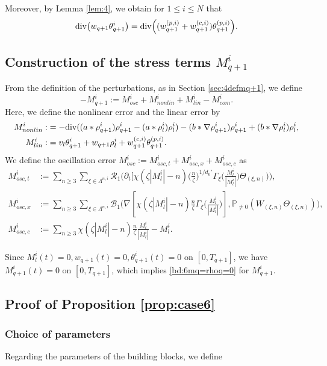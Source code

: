 \documentclass[UTF-8,reqno]{amsart}
\numberwithin{equation}{section}
\theoremstyle{definition}
\def\({{\Big(}}
\def\){{\Big)}}
\def\geq{\geqslant}
\def\leq{\leqslant}
\def\div{\mathord{{\rm div}}}
\def\({{\Big(}}
\def\){{\Big)}}
\def\geq{\geqslant}
\def\leq{\leqslant}
\def\div{\mathord{{\rm div}}}
\begin{document}
Moreover, by Lemma \ref{lem:4}, we obtain for
$
1\leq i\leq N 
$
that
\begin{align}
\div\bigl(
w_{q+1}\theta_{q+1}^i
\bigr)
=
\div\(
(w_{q+1}^{(p,i)}+w_{q+1}^{(c,i)})
\theta_{q+1}^{(p,i)}
\).\notag
\end{align}


\subsection{Construction of the stress terms $M^{i}_{q+1}$}\label{sec:6defmq+1}

From  the definition of the perturbations, as in Section \ref{sec:4defmq+1},  
we   define 
 $$-{M}^i_{q+1}:=M^{i}_{osc}+M^{i}_{nonlin}+M^{i}_{lin}-M_{com}^i.$$
 Here, we define the nonlinear error and the linear error   by
\begin{align*} 
M^{i}_{nonlin}:&= -\div( (a*\rho^{i}_{q+1}) \rho^{i}_{q+1}-(a*\rho^{i}_{l}) \rho^{i}_{l} )-(b*\nabla\rho_{q+1}^i)\rho_{q+1}^i+(b*\nabla\rho_{l}^i)\rho_{l}^i,\\
M^{i}_{lin}:&=v_l\theta^{i}_{q+1}+w_{q+1}\rho^{i}_l+w_{q+1}^{(c,i)}\theta_{q+1}^{(p,i)}.
\end{align*}
 We define the oscillation error  $M^{i}_{osc}:=M^{i}_{osc,t}+M^{i}_{osc,x}+M^{i}_{osc,c}$ as
\begin{align*}
   M^{i}_{osc,t}&:=\sum_{n\geq3}\sum_{\xi\in\Lambda^{n,i}}\mathcal{R}_{1}\(\partial_t[\chi(\zeta|M^{i}_l|-n)\(\frac{n}{\zeta}\)^{1/d_0'}\Gamma_{\xi}\(\frac{M^{i}_l}{|M^{i}_l|}\)\Theta_{(\xi,n)})\),\\
M^{i}_{osc,x}&:=\sum_{n\geq3}\sum_{\xi\in\Lambda^{n,i}}\mathcal{B}_{1}\(\nabla[\chi(\zeta|M^{i}_l|-n)\frac{n}{\zeta}\Gamma_{\xi}\(\frac{M^{i}_l}{|M^{i}_l|}\)],\mathbb{P}_{\neq0}(W_{(\xi,n)}\Theta_{(\xi,n)})\),\\
   M^{i}_{osc,c}&:=\sum_{n\geq3}\chi(\zeta|M^{i}_l|-n)\frac{n}{\zeta}\frac{M^{i}_l}{|M^{i}_l|}- M^{i}_l.
\end{align*}
 
Since $M^{i}_l(t)=0,w_{q+1}(t)=0,\theta^i_{q+1}(t)=0$ on $[0,T_{q+1}]$,  we have $M_{q+1}^i(t)=0$ on $[0,T_{q+1}]$, which implies  \eqref{bd:6mq=rhoq=0} for $M_{q+1}^i$. 


\subsection{ Proof of Proposition \ref{prop:case6}}   
\subsubsection{Choice of parameters} 
Regarding the parameters of the building blocks, we define
  
\end{document}
